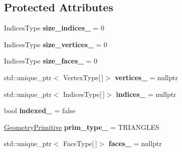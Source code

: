 \subsection*{\-Protected \-Attributes}
\begin{DoxyCompactItemize}
\item 
\hypertarget{classs9_1_1GeometryT_a10b48b6234990345813be8f2bba06f5b}{\-Indices\-Type {\bfseries size\-\_\-indices\-\_\-} = 0}\label{classs9_1_1GeometryT_a10b48b6234990345813be8f2bba06f5b}

\item 
\hypertarget{classs9_1_1GeometryT_a5c8c77b4471c67dc0724aac81a48e1ed}{\-Indices\-Type {\bfseries size\-\_\-vertices\-\_\-} = 0}\label{classs9_1_1GeometryT_a5c8c77b4471c67dc0724aac81a48e1ed}

\item 
\hypertarget{classs9_1_1GeometryT_accd218b227dec0ac31e9f67c19a20134}{\-Indices\-Type {\bfseries size\-\_\-faces\-\_\-} = 0}\label{classs9_1_1GeometryT_accd218b227dec0ac31e9f67c19a20134}

\item 
\hypertarget{classs9_1_1GeometryT_a8e5406e46993016893e3052614d291e4}{std\-::unique\-\_\-ptr$<$ \-Vertex\-Type\mbox{[}$\,$\mbox{]}$>$ {\bfseries vertices\-\_\-} = nullptr}\label{classs9_1_1GeometryT_a8e5406e46993016893e3052614d291e4}

\item 
\hypertarget{classs9_1_1GeometryT_a99d11cc160942e577030647b550a330d}{std\-::unique\-\_\-ptr$<$ \-Indices\-Type\mbox{[}$\,$\mbox{]}$>$ {\bfseries indices\-\_\-} = nullptr}\label{classs9_1_1GeometryT_a99d11cc160942e577030647b550a330d}

\item 
\hypertarget{classs9_1_1GeometryT_ac75a7c8e606158d28a0b515422cec893}{bool {\bfseries indexed\-\_\-} = false}\label{classs9_1_1GeometryT_ac75a7c8e606158d28a0b515422cec893}

\item 
\hypertarget{classs9_1_1GeometryT_af914c304f37ae7d4ac03da66e0c63bb8}{\hyperlink{namespaces9_ad57d1332f8fd67d23f6a1d3520ab785c}{\-Geometry\-Primitive} {\bfseries prim\-\_\-type\-\_\-} = \-T\-R\-I\-A\-N\-G\-L\-E\-S}\label{classs9_1_1GeometryT_af914c304f37ae7d4ac03da66e0c63bb8}

\item 
\hypertarget{classs9_1_1GeometryT_a4997414fb135d25c66717fdd551467b7}{std\-::unique\-\_\-ptr$<$ \-Face\-Type\mbox{[}$\,$\mbox{]}$>$ {\bfseries faces\-\_\-} = nullptr}\label{classs9_1_1GeometryT_a4997414fb135d25c66717fdd551467b7}

\end{DoxyCompactItemize}


